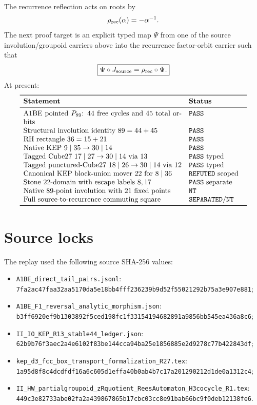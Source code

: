\documentclass[11pt,a4paper]{article}
\newcommand{\PASS}{\texttt{PASS}}
\newcommand{\REF}{\texttt{REFUTED}}
\newcommand{\SEP}{\texttt{SEPARATED}}
\newcommand{\NT}{\texttt{NT}}
\begin{document}
The recurrence reflection acts on roots by
\[
\rho_{\rm rec}(\alpha)=-\alpha^{-1}.
\]
The next proof target is an explicit typed map \(\Psi\) from one of the
source involution/groupoid carriers above into the recurrence
factor-orbit carrier such that
\[
\boxed{
\Psi\circ J_{\rm source}
=
\rho_{\rm rec}\circ\Psi.
}
\]
At present:
\[
\begin{array}{p{0.64\linewidth}p{0.22\linewidth}}
\toprule
\textbf{Statement}&\textbf{Status}\\\midrule
A1BE pointed $P_{89}$: \(44\) free cycles and \(45\) total orbits
&\PASS\\
Structural involution identity \(89=44+45\)
&\PASS\\
RH rectangle \(36=15+21\)
&\PASS\\
Native KEP \(9\mid35\to30\mid14\)
&\PASS\\
Tagged Cube27 \(17\mid27\to30\mid14\) via \(13\)
&\PASS\ typed\\
Tagged punctured-Cube27 \(18\mid26\to30\mid14\) via \(12\)
&\PASS\ typed\\
Canonical KEP block-union mover \(22\) for \(8\mid36\)
&\REF\ scoped\\
Stone \(22\)-domain with escape labels \(8,17\)
&\PASS\ separate\\
Native \(89\)-point involution with \(21\) fixed points
&\NT\\
Full source-to-recurrence commuting square
&\SEP/\NT\\
\bottomrule
\end{array}
\]

\section*{Source locks}

The replay used the following source SHA-256 values:
\begin{itemize}[leftmargin=2em]
\item \texttt{A1BE\_direct\_tail\_pairs.jsonl}:\\
\texttt{7fa2ac47faa32aa5170da5e18bb4fff236239b9d52f55021292b75a3e907e881};
\item \texttt{A1BE\_F1\_reversal\_analytic\_morphism.json}:\\
\texttt{b3ff6920ef9b1303892f5ced198fc1f33154194682891a9856bb545ea436a8c6};
\item \texttt{II\_IO\_KEP\_R13\_stable44\_ledger.json}:\\
\texttt{62b9b76f3aec2a4e6102f83be144cca94ba25e1856885e2d9278c77b422843df};
\item \texttt{kep\_d3\_fcc\_box\_transport\_formalization\_R27.tex}:\\
\texttt{1a95d8f8c4dcdfdf16a6c605d1effa40b0ab4b7c17a201290212d1de0a1312c4};
\item \texttt{II\_HW\_partialgroupoid\_zRquotient\_ReesAutomaton\_H3cocycle\_R1.tex}:\\
\texttt{449c3e82733abe02fa2a439867865b17cbc03cc8e91bab66bc9f0deb12138fe6}.
\end{itemize}
\end{document}
